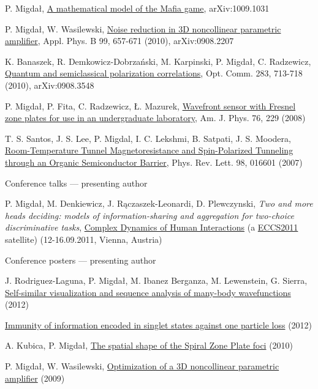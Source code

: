 \documentclass[margin,line]{resume}
\begin{document}
\begin{resume}
\begin{list2}
    	\item P. Migdał, \href{http://arxiv.org/abs/1009.1031}{A mathematical model of the Mafia game}, arXiv:1009.1031
        \item P. Migdał, W. Wasilewski, \href{http://dx.doi.org/10.1007/s00340-010-3915-z}{Noise reduction in 3D noncollinear parametric amplifier}, Appl. Phys. B 99, 657-671 (2010), arXiv:0908.2207
        \item K. Banaszek, R. Demkowicz-Dobrzański, M. Karpinski, P. Migdał, C. Radzewicz, \href{http://arxiv.org/abs/0908.3548}{Quantum and semiclassical polarization correlations}, Opt. Comm. 283, 713-718 (2010), arXiv:0908.3548
        \item P. Migdał, P. Fita, C. Radzewicz, Ł. Mazurek, \href{http://ultrafast.fuw.edu.pl/publications/ajp_2008.pdf}{Wavefront sensor with Fresnel zone plates for use in an undergraduate laboratory}, Am. J. Phys. 76, 229 (2008)
        \item T. S. Santos, J. S. Lee, P. Migdal, I. C. Lekshmi, B. Satpati, J. S. Moodera, \href{http://dx.doi.org/10.1103/PhysRevLett.98.016601}{Room-Temperature Tunnel Magnetoresistance and Spin-Polarized Tunneling through an Organic Semiconductor Barrier}, Phys. Rev. Lett. 98, 016601 (2007)
    \end{list2}

    Conference talks --- presenting author
     \begin{list2}
        \item P. Migdał, M. Denkiewicz, J. Rączaszek-Leonardi, D. Plewczynski, {\sl Two and more heads deciding: models of information-sharing and aggregation for two-choice discriminative tasks}, \href{http://markov.uc3m.es/complexdynamics11/Home.html}{Complex Dynamics of Human Interactions} (a \href{http://www.eccs2011.eu/}{ECCS2011} satellite) (12-16.09.2011, Vienna, Austria)
    \end{list2}   

    Conference posters --- presenting author
    \begin{list2}
        \item J. Rodriguez-Laguna, P. Migdał, M. Ibanez Berganza, M. Lewenstein, G. Sierra, \href{http://dx.doi.org/10.6084/m9.figshare.97233}{Self-similar visualization and sequence analysis of many-body wavefunctions} (2012)
        \item \href{http://dx.doi.org/10.6084/m9.figshare.97235}{Immunity of information encoded in singlet states against one particle loss} (2012)
        \item A. Kubica, P. Migdał, \href{http://dx.doi.org/10.6084/m9.figshare.97236}{The spatial shape of the Spiral Zone Plate foci} (2010)
        \item P. Migdał, W. Wasilewski, \href{http://dx.doi.org/10.6084/m9.figshare.97237}{Optimization of a 3D noncollinear parametric amplifier} (2009)
    \end{list2}
    

\end{resume}
\end{document}
